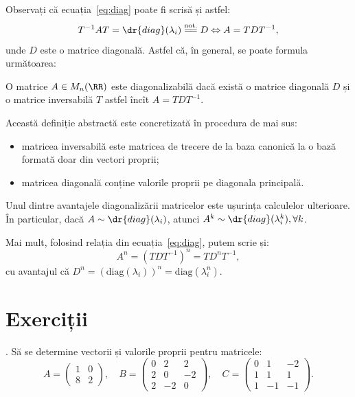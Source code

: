 Observați că ecuația~\eqref{eq:diag} poate fi scrisă și astfel:
\[
  T^{-1}AT = \dr{diag}(\lambda_i) \stackrel{\text{not.}}{=\joinrel=} D \Leftrightarrow %
  A = TDT^{-1},
\]
unde $ D $ este o matrice diagonală. Astfel că, în general, se poate formula următoarea:

\begin{definition}\label{def:diag}
  O matrice $ A \in M_n(\RR) $ este diagonalizabilă dacă există o matrice diagonală $ D $
  și o matrice inversabilă $ T $ astfel încît $ A = TDT^{-1} $.
\end{definition}

Această definiție abstractă este concretizată în procedura de mai sus:
\begin{itemize}
\item matricea inversabilă este matricea de trecere de la baza canonică la o bază
  formată doar din vectori proprii;
\item matricea diagonală conține valorile proprii pe diagonala principală.
\end{itemize}

\begin{remark}\label{rk:diag-putere}
  Unul dintre avantajele diagonalizării matricelor este ușurința calculelor
  ulterioare. În particular, dacă $ A \sim \dr{diag}(\lambda_i) $,
  atunci $ A^k \sim \dr{diag}(\lambda_i^k), \forall k $.

  Mai mult, folosind relația din ecuația~\eqref{eq:diag}, putem scrie și:
  \[
    A^n = (TDT^{-1})^n = TD^nT^{-1},
  \]
  cu avantajul că $ D^n = \left(\mathrm{diag}(\lambda_i)\right)^n = \mathrm{diag}(\lambda_i^n) $.
\end{remark}


\section{Exerciții}

\indent{}. Să se determine vectorii și valorile proprii pentru matricele:
\[
  A = \begin{pmatrix} 1 & 0 \\ 8 & 2 \end{pmatrix}, \quad %
  B = \begin{pmatrix} 0 & 2 & 2 \\ 2 & 0 & -2 \\ 2 & -2 & 0 \end{pmatrix}, \quad %
  C = \begin{pmatrix} 0 & 1 & -2 \\ 1 & 1 & 1 \\ 1 & -1 & -1 \end{pmatrix}.
\]

